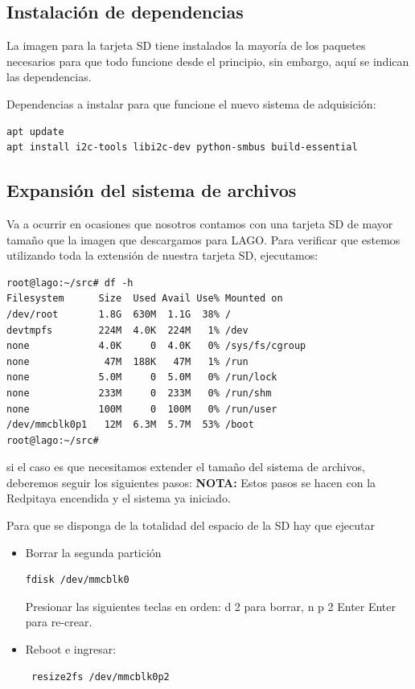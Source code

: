 \documentclass[a4paper,11pt]{article}
\begin{document}
\subsection{Instalación de dependencias}

La imagen para la tarjeta SD tiene instalados la mayoría de los paquetes
necesarios para que todo funcione desde el principio, sin embargo, aquí se
indican las dependencias.

\noindent Dependencias a instalar para que funcione el nuevo sistema de
adquisición:

\begin{verbatim}
apt update
apt install i2c-tools libi2c-dev python-smbus build-essential
\end{verbatim}

\subsection{Expansión del sistema de archivos}\label{subsub_expansion_sd}
Va a ocurrir en ocasiones que nosotros contamos con una tarjeta SD de mayor
tamaño que la imagen que descargamos para LAGO. Para verificar que estemos
utilizando toda la extensión de nuestra tarjeta SD, ejecutamos: 

\begin{verbatim}
root@lago:~/src# df -h
Filesystem      Size  Used Avail Use% Mounted on
/dev/root       1.8G  630M  1.1G  38% /
devtmpfs        224M  4.0K  224M   1% /dev
none            4.0K     0  4.0K   0% /sys/fs/cgroup
none             47M  188K   47M   1% /run
none            5.0M     0  5.0M   0% /run/lock
none            233M     0  233M   0% /run/shm
none            100M     0  100M   0% /run/user
/dev/mmcblk0p1   12M  6.3M  5.7M  53% /boot
root@lago:~/src# 

\end{verbatim}

\noindent si el caso es que necesitamos extender el tamaño del sistema de
archivos, deberemos seguir los siguientes pasos: 
\textbf{NOTA:} Estos pasos se hacen con la Redpitaya encendida y el sistema ya
iniciado.

\noindent Para que se disponga de la totalidad del espacio de la SD hay que ejecutar
\begin{itemize}
\item Borrar la segunda partición
\begin{verbatim}
fdisk /dev/mmcblk0
\end{verbatim}
Presionar las siguientes teclas en orden:
d 2 para borrar,
n p 2 Enter Enter para re-crear.

\item Reboot e ingresar:
\begin{verbatim}
 resize2fs /dev/mmcblk0p2
\end{verbatim}

\end{itemize}
\end{document}
